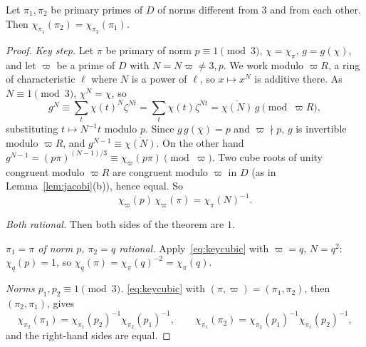 \begin{theorem}\label{thm:cubicrec}
Let $\pi_1,\pi_2$ be primary primes of $D$ of norms different from $3$ and from each other. Then $\chi_{\pi_1}(\pi_2)=\chi_{\pi_2}(\pi_1)$.
\end{theorem}
\begin{proof}
\emph{Key step.} Let $\pi$ be primary of norm $p\equiv1\pmod3$, $\chi=\chi_\pi$, $g=g(\chi)$, and let $\varpi$ be a prime of $D$ with $N=N\varpi\ne3,p$. We
work modulo $\varpi R$, a ring of characteristic $\ell$ where $N$ is a power of $\ell$, so $x\mapsto x^N$ is additive there. As $N\equiv1\pmod3$, $\chi^N=\chi$, so
\[
g^N\equiv\sum_t\chi(t)^N\zeta^{Nt}=\sum_t\chi(t)\zeta^{Nt}=\overline{\chi(N)}\,g\pmod{\varpi R},
\]
substituting $t\mapsto N^{-1}t$ modulo $p$. Since $g\,g(\overline{\chi})=p$ and $\varpi\nmid p$, $g$ is invertible modulo $\varpi R$, and $g^{N-1}\equiv\overline{\chi(N)}$. On the
other hand $g^{N-1}=(p\pi)^{(N-1)/3}\equiv\chi_\varpi(p\pi)\pmod{\varpi}$. Two cube roots of unity congruent modulo $\varpi R$ are congruent modulo $\varpi$ in $D$
(as in Lemma~\ref{lem:jacobi}(b)), hence equal. So
\begin{equation}\label{eq:keycubic}
\chi_\varpi(p)\,\chi_\varpi(\pi)=\chi_\pi(N)^{-1}.
\end{equation}

\emph{Both rational.} Then both sides of the theorem are $1$.

\emph{$\pi_1=\pi$ of norm $p$, $\pi_2=q$ rational.} Apply~\eqref{eq:keycubic} with $\varpi=q$, $N=q^2$: $\chi_q(p)=1$, so $\chi_q(\pi)=\chi_\pi(q)^{-2}=\chi_\pi(q)$.

\emph{Norms $p_1,p_2\equiv1\pmod3$.} \eqref{eq:keycubic} with $(\pi,\varpi)=(\pi_1,\pi_2)$, then $(\pi_2,\pi_1)$, gives
\[
\chi_{\pi_2}(\pi_1)=\chi_{\pi_1}(p_2)^{-1}\chi_{\pi_2}(p_1)^{-1},\qquad \chi_{\pi_1}(\pi_2)=\chi_{\pi_2}(p_1)^{-1}\chi_{\pi_1}(p_2)^{-1},
\]
and the right-hand sides are equal.
\end{proof}


